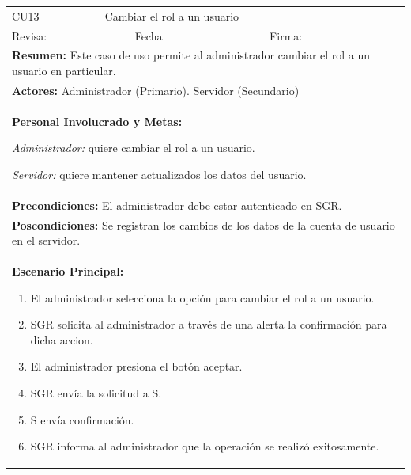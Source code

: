 			\begin{longtable}{|l|p{5.5cm}|l|p{2cm}|l|p{1.9cm}|} \hline
					\cellcolor{grisOscuro} CU13 & \multicolumn{4}{|l|}{  \cellcolor{grisOscuro} Cambiar el rol a un usuario} &  \cellcolor{grisClaro}\multirow{2}{1cm}{} \\ \cline{1-5}
					\cellcolor{grisOscuro} Revisa: &  \cellcolor{grisClaro} &  \cellcolor{grisOscuro} Fecha &  \cellcolor{grisClaro} &  \cellcolor{grisOscuro} Firma: & \cellcolor{grisClaro} \\ \hline
					\multicolumn{6}{|p{15cm}|}{ \textbf{Resumen: } Este caso de uso permite al administrador cambiar el rol a un usuario en particular.

					} \\ \hline

					\multicolumn{6}{|p{15cm}|}{ \textbf{Actores: } Administrador (Primario). Servidor (Secundario)

					} \\ \hline

					\multicolumn{6}{|p{15cm}|}{ \textbf{Personal Involucrado y Metas: }
					
					\emph{Administrador:} quiere cambiar el rol a un usuario.

					\emph{Servidor:} quiere mantener actualizados los datos del usuario.

					} \\ \hline

					\multicolumn{6}{|p{15cm}|}{ \textbf{Precondiciones: } El administrador debe estar autenticado en SGR.

					} \\ \hline

					\multicolumn{6}{|p{15cm}|}{ \textbf{Poscondiciones: } Se registran los cambios de los datos de la cuenta de usuario en el servidor.

					} \\ \hline

					\multicolumn{6}{|p{15cm}|}{ \textbf{Escenario Principal: }

					\begin{enumerate}
							\item El administrador selecciona la opción para cambiar el rol a un usuario.
							\item SGR solicita al administrador a través de una alerta la confirmación para dicha accion.
							\item El administrador presiona el botón aceptar.
							\item SGR envía la solicitud a S.
							\item S envía confirmación.
							\item SGR informa al administrador que la operación se realizó exitosamente.
					\end{enumerate}

}
\end{longtable}
